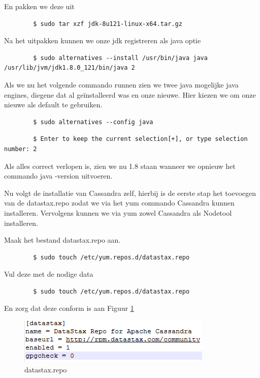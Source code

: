 	\par
	En pakken we deze uit
	\begin{lstlisting}
		$ sudo tar xzf jdk-8u121-linux-x64.tar.gz
	\end{lstlisting}
	
	\par
	Na het uitpakken kunnen we onze jdk registreren als java optie
	\begin{lstlisting}
		$ sudo alternatives --install /usr/bin/java java /usr/lib/jvm/jdk1.8.0_121/bin/java 2
	\end{lstlisting}
	
	\par
	Als we nu het volgende commando runnen zien we twee java mogelijke java engines, diegene dat al ge\"installeerd was en onze nieuwe. 
	Hier kiezen we om onze nieuwe als default te gebruiken.
	\begin{lstlisting}
		$ sudo alternatives --config java
	\end{lstlisting}
	\begin{lstlisting}
		$ Enter to keep the current selection[+], or type selection number: 2
	\end{lstlisting}
	
	\par
	Als alles correct verlopen is, zien we nu 1.8 staan wanneer we opnieuw het commando \textquotedbl java -version\textquotedbl{} uitvoeren.
	
	\par
	Nu volgt de installatie van Cassandra zelf, hierbij is de eerste stap het toevoegen van de datastax.repo zodat we via het yum commando Cassandra kunnen installeren.
	 Vervolgens kunnen we via yum zowel Cassandra als Nodetool installeren.
	\par
	Maak het bestand datastax.repo aan.
	\begin{lstlisting}
		$ sudo touch /etc/yum.repos.d/datastax.repo
	\end{lstlisting}
	\par
	Vul deze met de nodige data
	\begin{lstlisting}
		$ sudo touch /etc/yum.repos.d/datastax.repo
	\end{lstlisting}
	En zorg dat deze conform is aan Figuur \ref{fig:datastax.repo}
	\begin{figure}[h!]
  		\includegraphics[width=\linewidth]{images/datastax-repo.PNG}
  		\caption{datastax.repo}
  		\label{fig:datastax.repo}
	\end{figure}
	
